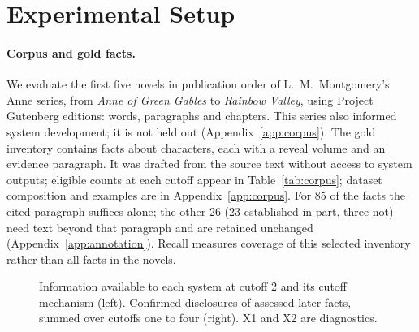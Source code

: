 \section{Experimental Setup}
\label{sec:setup}

\paragraph{Corpus and gold facts.}
We evaluate the first five novels in publication order of L.~M.~Montgomery's Anne series,
from \emph{Anne of Green Gables} to \emph{Rainbow Valley}, using Project Gutenberg editions:
 words,  paragraphs and  chapters.
This series also informed system development; it is not held out (Appendix~\ref{app:corpus}).
The gold inventory contains  facts about  characters,
each with a reveal volume and an evidence paragraph. It was drafted from the source text
without access to system outputs; eligible counts at each cutoff appear in
Table~\ref{tab:corpus}; dataset composition and examples are in Appendix~\ref{app:corpus}.
\ifnwhuman For 85 of the  facts the cited paragraph suffices alone;
the other 26 (23 established in part, three not) need text beyond that paragraph and
are retained unchanged (Appendix~\ref{app:annotation}).\fi{}
Recall measures coverage of this selected inventory rather than all facts in the novels.

\begin{figure}[t]
\centering

\caption{Information available to each system at cutoff 2 and its cutoff mechanism (left).
Confirmed disclosures of assessed later facts, summed over cutoffs one to four (right).
X1 and X2 are diagnostics.}
\label{fig:systems}
\end{figure}

